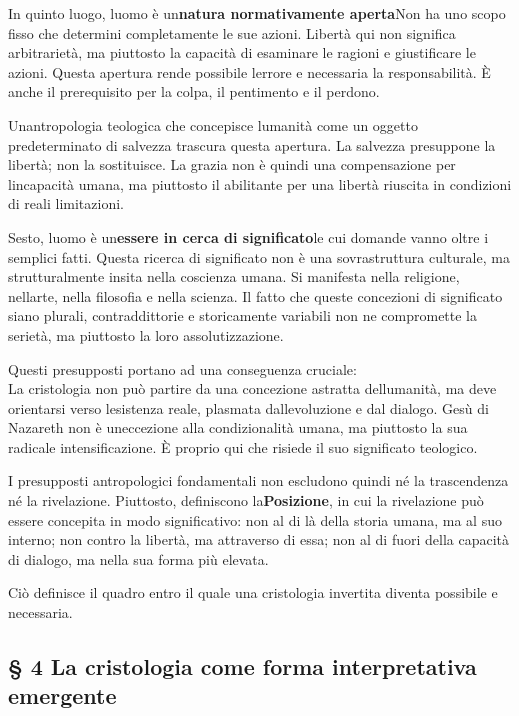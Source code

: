 \documentclass[
]{article}
\begin{document}
In quinto luogo, l\textquotesingle uomo è un\textbf{natura normativamente aperta}Non ha uno scopo fisso che determini completamente le sue azioni. Libertà qui non significa arbitrarietà, ma piuttosto la capacità di esaminare le ragioni e giustificare le azioni. Questa apertura rende possibile l\textquotesingle errore e necessaria la responsabilità. È anche il prerequisito per la colpa, il pentimento e il perdono.

Un\textquotesingle antropologia teologica che concepisce l\textquotesingle umanità come un oggetto predeterminato di salvezza trascura questa apertura. La salvezza presuppone la libertà; non la sostituisce. La grazia non è quindi una compensazione per l\textquotesingle incapacità umana, ma piuttosto il abilitante per una libertà riuscita in condizioni di reali limitazioni.

Sesto, l\textquotesingle uomo è un\textbf{essere in cerca di significato}le cui domande vanno oltre i semplici fatti. Questa ricerca di significato non è una sovrastruttura culturale, ma strutturalmente insita nella coscienza umana. Si manifesta nella religione, nell\textquotesingle arte, nella filosofia e nella scienza. Il fatto che queste concezioni di significato siano plurali, contraddittorie e storicamente variabili non ne compromette la serietà, ma piuttosto la loro assolutizzazione.

Questi presupposti portano ad una conseguenza cruciale:\\
La cristologia non può partire da una concezione astratta dell\textquotesingle umanità, ma deve orientarsi verso l\textquotesingle esistenza reale, plasmata dall\textquotesingle evoluzione e dal dialogo. Gesù di Nazareth non è un\textquotesingle eccezione alla condizionalità umana, ma piuttosto la sua radicale intensificazione. È proprio qui che risiede il suo significato teologico.

I presupposti antropologici fondamentali non escludono quindi né la trascendenza né la rivelazione. Piuttosto, definiscono la\textbf{Posizione}, in cui la rivelazione può essere concepita in modo significativo: non al di là della storia umana, ma al suo interno; non contro la libertà, ma attraverso di essa; non al di fuori della capacità di dialogo, ma nella sua forma più elevata.

Ciò definisce il quadro entro il quale una cristologia invertita diventa possibile e necessaria.

\subsection{\texorpdfstring{\textbf{§ 4 La cristologia come forma interpretativa emergente}}{§ 4 La cristologia come forma interpretativa emergente}}\label{la-cristologia-come-forma-interpretativa-emergente}
\end{document}
